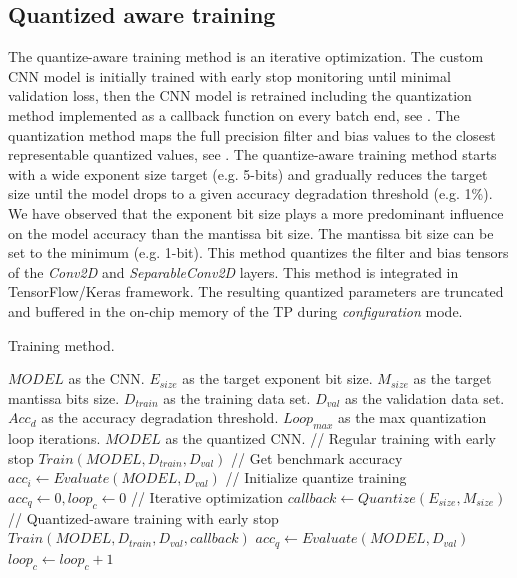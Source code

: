 \subsection{\textbf{Quantized aware training}}
The quantize-aware training method is an iterative optimization. The custom CNN model is initially trained with early stop monitoring until minimal validation loss, then the CNN model is retrained including the quantization method implemented as a callback function on every batch end, see . The quantization method maps the full precision filter and bias values to the closest representable quantized values, see . The quantize-aware training method starts with a wide exponent size target (e.g. 5-bits) and gradually reduces the target size until the model drops to a given accuracy degradation threshold (e.g. 1\%). We have observed that the exponent bit size plays a more predominant influence on the model accuracy than the mantissa bit size. The mantissa bit size can be set to the minimum (e.g. 1-bit). This method quantizes the filter and bias tensors of the \emph{Conv2D} and \emph{SeparableConv2D} layers. This method is integrated in TensorFlow/Keras framework. The resulting quantized parameters are truncated and buffered in the on-chip memory of the TP during \emph{configuration} mode.
\begin{algorithm}[h!]
	\label{alg:training}
	\caption{Training method.}
	\begin{algorithmic}
		\SetAlgoLined
		\renewcommand{\algorithmicrequire}{\textbf{input:}}
		\renewcommand{\algorithmicensure}{\textbf{output:}}
		\REQUIRE $MODEL$ as the CNN.
		\REQUIRE $E_{size}$ as the target exponent bit size.
		\REQUIRE $M_{size}$ as the target mantissa bits size.
		\REQUIRE $D_{train}$ as the training data set.
		\REQUIRE $D_{val}$ as the validation data set.
		\REQUIRE $Acc_d$ as the accuracy degradation threshold.
		\REQUIRE $Loop_{max}$ as the max quantization loop iterations.
		\ENSURE $MODEL$ as the quantized CNN.
		\STATE // Regular training with early stop
		\STATE $Train(MODEL, D_{train}, D_{val})$
		\STATE // Get benchmark accuracy
		\STATE $acc_i \gets Evaluate(MODEL, D_{val})$
		\STATE // Initialize quantize training
		\STATE $acc_q \gets 0, loop_c \gets 0$
		\STATE // Iterative optimization
		\STATE $callback \gets Quantize(E_{size}, M_{size})$
		\STATE // Quantized-aware training with early stop
		\STATE $Train(MODEL, D_{train}, D_{val}, callback)$
		\STATE $acc_q \gets Evaluate(MODEL, D_{val})$
		\STATE $loop_c \gets loop_c + 1$
		\ENDWHILE
	\end{algorithmic}
\end{algorithm}
